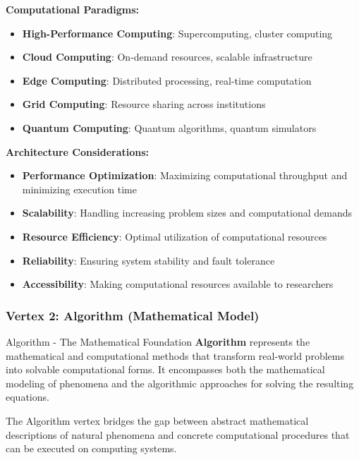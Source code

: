 \textbf{Computational Paradigms:}
\begin{itemize}
    \item \textbf{High-Performance Computing}: Supercomputing, cluster computing
    \item \textbf{Cloud Computing}: On-demand resources, scalable infrastructure
    \item \textbf{Edge Computing}: Distributed processing, real-time computation
    \item \textbf{Grid Computing}: Resource sharing across institutions
    \item \textbf{Quantum Computing}: Quantum algorithms, quantum simulators
\end{itemize}

\textbf{Architecture Considerations:}
\begin{itemize}
    \item \textbf{Performance Optimization}: Maximizing computational throughput and minimizing execution time
    \item \textbf{Scalability}: Handling increasing problem sizes and computational demands
    \item \textbf{Resource Efficiency}: Optimal utilization of computational resources
    \item \textbf{Reliability}: Ensuring system stability and fault tolerance
    \item \textbf{Accessibility}: Making computational resources available to researchers
\end{itemize}

\subsubsection{Vertex 2: Algorithm (Mathematical Model)}

\begin{conceptcard}{Algorithm - The Mathematical Foundation}
\textbf{Algorithm} represents the mathematical and computational methods that transform real-world problems into solvable computational forms. It encompasses both the mathematical modeling of phenomena and the algorithmic approaches for solving the resulting equations.
\end{conceptcard}

The Algorithm vertex bridges the gap between abstract mathematical descriptions of natural phenomena and concrete computational procedures that can be executed on computing systems.

